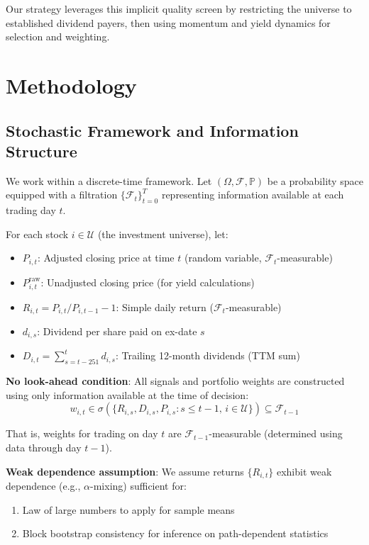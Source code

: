 \documentclass[12pt,a4paper]{article}
\theoremstyle{definition}
\begin{document}
Our strategy leverages this implicit quality screen by restricting the universe to established dividend payers, then using momentum and yield dynamics for selection and weighting.

\section{Methodology}
\label{sec:methodology}

\subsection{Stochastic Framework and Information Structure}

We work within a discrete-time framework. Let $(\Omega, \mathcal{F}, \mathbb{P})$ be a probability space equipped with a filtration $\{\mathcal{F}_t\}_{t=0}^T$ representing information available at each trading day $t$.

For each stock $i \in \mathcal{U}$ (the investment universe), let:
\begin{itemize}
    \item $P_{i,t}$: Adjusted closing price at time $t$ (random variable, $\mathcal{F}_t$-measurable)
    \item $P_{i,t}^{\text{raw}}$: Unadjusted closing price (for yield calculations)
    \item $R_{i,t} = P_{i,t}/P_{i,t-1} - 1$: Simple daily return ($\mathcal{F}_t$-measurable)
    \item $d_{i,s}$: Dividend per share paid on ex-date $s$
    \item $D_{i,t} = \sum_{s=t-251}^{t} d_{i,s}$: Trailing 12-month dividends (TTM sum)
\end{itemize}

\textbf{No look-ahead condition}: All signals and portfolio weights are constructed using only information available at the time of decision:
\begin{equation}
w_{i,t} \in \sigma\left(\{R_{i,s}, D_{i,s}, P_{i,s} : s \leq t-1, \, i \in \mathcal{U}\}\right) \subseteq \mathcal{F}_{t-1}
\label{eq:measurability}
\end{equation}

That is, weights for trading on day $t$ are $\mathcal{F}_{t-1}$-measurable (determined using data through day $t-1$).

\textbf{Weak dependence assumption}: We assume returns $\{R_{i,t}\}$ exhibit weak dependence (e.g., $\alpha$-mixing) sufficient for:
\begin{enumerate}
    \item Law of large numbers to apply for sample means
    \item Block bootstrap consistency for inference on path-dependent statistics
\end{enumerate}
\end{document}
